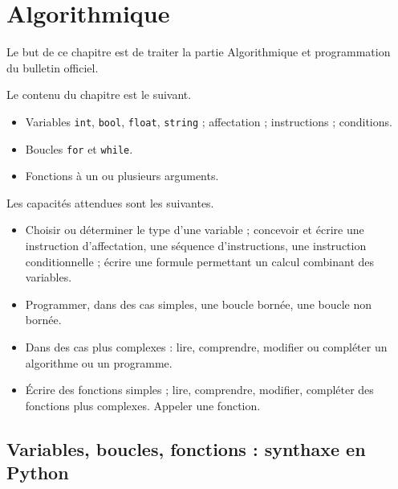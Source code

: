 
\chapter{Algorithmique}

Le but de ce chapitre est de traiter la partie \og Algorithmique et programmation \fg~ du bulletin officiel.

Le contenu du chapitre est le suivant.
	\begin{itemize}
		\item Variables \texttt{int}, \texttt{bool}, \texttt{float}, \texttt{string} ; affectation ; instructions ; conditions.
		\item Boucles \texttt{for} et \texttt{while}.
		\item Fonctions à un ou plusieurs arguments.
	\end{itemize}

Les capacités attendues sont les suivantes.
	\begin{itemize}
		\item Choisir ou déterminer le type d'une variable ; concevoir et écrire une instruction d'affectation, une séquence d'instructions, une instruction conditionnelle ; écrire une formule permettant un calcul combinant des variables.
		\item Programmer, dans des cas simples, une boucle bornée, une boucle non bornée.
		\item Dans des cas plus complexes : lire, comprendre, modifier ou compléter un algorithme ou un programme.
		\item Écrire des fonctions simples ; lire, comprendre, modifier, compléter des fonctions plus complexes. Appeler une fonction.
	\end{itemize}


\section{Variables, boucles, fonctions : synthaxe en Python}

